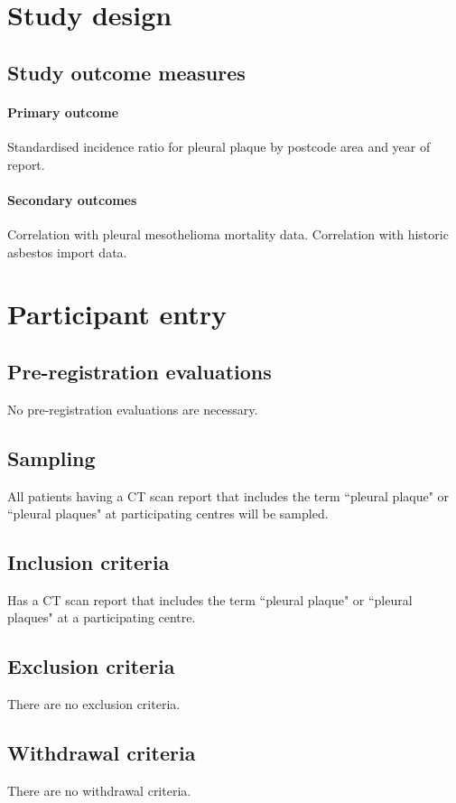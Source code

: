 \documentclass[a4paper,10pt]{article}
\begin{document}
\section{Study design}
\subsection{Study outcome measures}

\paragraph{Primary outcome}
Standardised incidence ratio for pleural plaque by postcode area and year of report. 


\paragraph{Secondary outcomes}
Correlation with pleural mesothelioma mortality data. Correlation with historic asbestos import data.


\section{Participant entry}
\subsection{Pre-registration evaluations}
No pre-registration evaluations are necessary.

\subsection{Sampling}
All patients having a CT scan report that includes the term ``pleural plaque" or ``pleural plaques" at participating centres will be sampled. 

\subsection{Inclusion criteria}
Has a CT scan report that includes the term ``pleural plaque" or ``pleural plaques" at a participating centre.

\subsection{Exclusion criteria}
There are no exclusion criteria.

\subsection{Withdrawal criteria} 
There are no withdrawal criteria.
\end{document}
